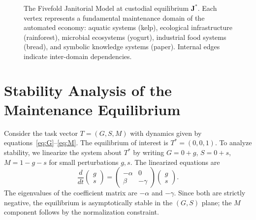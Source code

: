 \documentclass[12pt,a4paper]{article}
\theoremstyle{plain}
\theoremstyle{definition}
\theoremstyle{remark}
\begin{document}
\begin{figure}[h]
\centering
{}
\caption{The Fivefold Janitorial Model at custodial equilibrium $\mathbf{J}^*$.
Each vertex represents a fundamental maintenance domain of the automated
economy: aquatic systems (kelp), ecological infrastructure (rainforest),
microbial ecosystems (yogurt), industrial food systems (bread), and symbolic
knowledge systems (paper).  Internal edges indicate inter-domain dependencies.}
\label{fig:pentagon}
\end{figure}

\section{Stability Analysis of the Maintenance Equilibrium}
\label{app:stability}

Consider the task vector $T = (G,S,M)$ with dynamics given by
equations~\eqref{eq:G}--\eqref{eq:M}.  The equilibrium of interest is
$T^* = (0,0,1)$.  To analyze stability, we linearize the system about
$T^*$ by writing $G = 0 + g$, $S = 0 + s$, $M = 1 - g - s$ for small
perturbations $g,s$.  The linearized equations are
\[
\frac{d}{dt}\begin{pmatrix}g\\s\end{pmatrix}
=
\begin{pmatrix}-\alpha & 0 \\ \beta & -\gamma\end{pmatrix}
\begin{pmatrix}g\\s\end{pmatrix}.
\]
The eigenvalues of the coefficient matrix are $-\alpha$ and $-\gamma$.
Since both are strictly negative, the equilibrium is asymptotically stable
in the $(G,S)$ plane; the $M$ component follows by the normalization
constraint.
\end{document}
